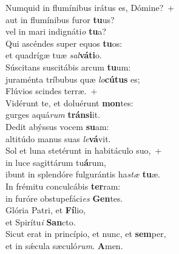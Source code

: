 \evenverse Numquid in flumínibus irátus es, Dómine?~+\\\evenverse  aut in flumínibus furor \textbf{tu}us?~\*\\
\evenverse vel in mari indignáti\textit{o} \textbf{tu}a?\\
\oddverse Qui ascéndes super equos \textbf{tu}os:~\*\\
\oddverse et quadrígæ tuæ \textit{sal}\textbf{vá}\textbf{ti}o.\\
\evenverse Súscitans suscitábis arcum \textbf{tu}um:~\*\\
\evenverse juraménta tríbubus quæ \textit{lo}\textbf{cú}\textbf{tus} es;\\
\oddverse Flúvios scindes terræ.~+\\
\oddverse  Vidérunt te, et doluérunt \textbf{mon}tes:~\*\\
\oddverse gurges aquá\textit{rum} \textbf{trán}\textbf{si}it.\\
\evenverse Dedit abýssus vocem \textbf{su}am:~\*\\
\evenverse altitúdo manus suas \textit{le}\textbf{vá}vit.\\
\oddverse Sol et luna stetérunt in habitáculo suo,~+\\
\oddverse  in luce sagittárum tu\textbf{á}rum,~\*\\
\oddverse ibunt in splendóre fulgurántis ha\textit{stæ} \textbf{tu}æ.\\
\evenverse In frémitu conculcábis \textbf{ter}ram:~\*\\
\evenverse in furóre obstupefáci\textit{es} \textbf{Gen}tes.\\
\oddverse Glória Patri, et \textbf{Fí}lio,~\*\\
\oddverse et Spirítu\textit{i} \textbf{San}cto.\\
\evenverse Sicut erat in princípio, et nunc, et \textbf{sem}per,~\*\\
\evenverse et in sǽcula sæculó\textit{rum}. \textbf{A}men.\\
